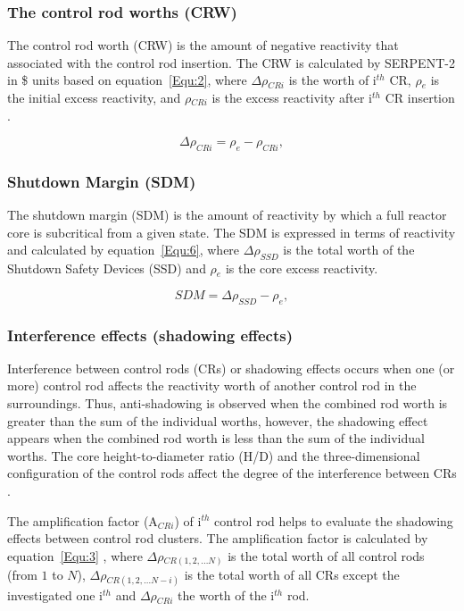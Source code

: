 \subsubsection{The control rod worths (CRW)}

The control rod worth (CRW) is the amount of negative reactivity that associated with the control rod insertion. The CRW is calculated by SERPENT-2 in \$ units based on equation~\ref{Equ:2}, where $\Delta\rho$$_{CRi}$ is the worth of i$^{th}$ CR, $\rho$$_e$ is the initial excess reactivity, and $\rho$$_{CRi}$ is the excess reactivity after i$^{th}$ CR insertion \cite{vcerba2017optimization}.

\begin{equation}
\label{Equ:2}
{{\Delta}{\rho}_{CRi}}={{\rho}_{e}}-{{\rho}_{CRi}},
\end{equation}

\subsubsection{Shutdown Margin (SDM)}

The shutdown margin (SDM) is the amount of reactivity by which a full reactor core is subcritical from a given state. The SDM is expressed in terms of reactivity and calculated by equation~\ref{Equ:6}, where $\Delta\rho_{SSD}$ is the total worth of the Shutdown Safety Devices (SSD) and $\rho$$_e$ is the core excess reactivity.

\begin{equation}
\label{Equ:6}
{SDM}={{\Delta}{\rho}_{SSD}}-{{\rho}_{e}},
\end{equation}

\subsubsection{Interference effects (shadowing effects)}

Interference between control rods (CRs) or shadowing effects occurs when one (or more) control rod affects the reactivity worth of another control rod in the surroundings. Thus, anti-shadowing is observed when the combined rod worth is greater than the sum of the individual worths, however, the shadowing effect appears when the combined rod worth is less than the sum of the individual worths.
The core height-to-diameter ratio (H/D) and the three-dimensional configuration of the control rods affect the degree of the interference between CRs \cite{girardin2007control}. 

The amplification factor (A$_{CRi}$) of i$^{th}$ control rod helps to evaluate the shadowing effects between control rod clusters. The amplification factor is calculated by equation~\ref{Equ:3} \cite{girardin2007control,vcerba2017optimization}, where $\Delta\rho$$_{CR(1,2,\ldots N)}$ is the total worth of all control rods (from $1$ to $N$), $\Delta\rho$$_{CR(1,2,\ldots N-i)}$ is the total worth of all CRs except the investigated one i$^{th}$ and $\Delta\rho$$_{CRi}$ the worth of the i$^{th}$ rod.

